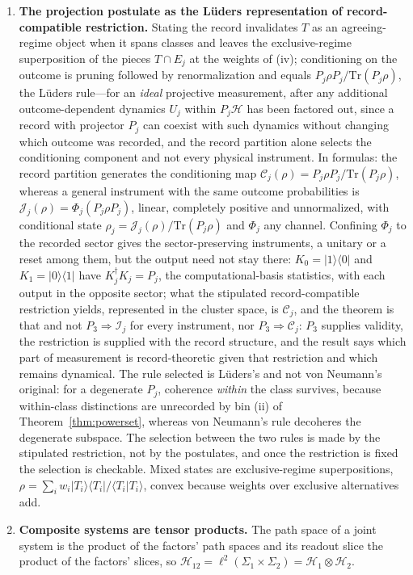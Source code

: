 \begin{theorem}
\begin{enumerate}
\item[(v)] \textbf{The projection postulate as the L\"{u}ders representation of record-compatible restriction.} Stating the record invalidates $T$ as an agreeing-regime object when it spans classes and leaves the exclusive-regime superposition of the pieces $T \cap E_j$ at the weights of (iv); conditioning on the outcome is pruning followed by renormalization and equals $P_j\rho P_j/\mathrm{Tr}(P_j\rho)$, the L\"uders rule---for an \emph{ideal} projective measurement, after any additional outcome-dependent dynamics $U_j$ within $P_j\mathcal{H}$ has been factored out, since a record with projector $P_j$ can coexist with such dynamics without changing which outcome was recorded, and the record partition alone selects the conditioning component and not every physical instrument. In formulas: the record partition generates the conditioning map $\mathcal{C}_j(\rho) = P_j \rho P_j / \mathrm{Tr}(P_j \rho)$, whereas a general instrument with the same outcome probabilities is $\mathcal{J}_j(\rho) = \Phi_j(P_j \rho P_j)$, linear, completely positive and unnormalized, with conditional state $\rho_j = \mathcal{J}_j(\rho)/\mathrm{Tr}(P_j \rho)$ and $\Phi_j$ any channel. Confining $\Phi_j$ to the recorded sector gives the sector-preserving instruments, a unitary or a reset among them, but the output need not stay there: $K_0 = |1\rangle\langle 0|$ and $K_1 = |0\rangle\langle 1|$ have $K_j^{\dagger} K_j = P_j$, the computational-basis statistics, with each output in the opposite sector; what the stipulated record-compatible restriction yields, represented in the cluster space, is $\mathcal{C}_j$, and the theorem is that and not $P_3 \Rightarrow \mathcal{I}_j$ for every instrument, nor $P_3 \Rightarrow \mathcal{C}_j$: $P_3$ supplies validity, the restriction is supplied with the record structure, and the result says which part of measurement is record-theoretic given that restriction and which remains dynamical. The rule selected is L\"uders's and not von Neumann's original: for a degenerate $P_j$, coherence \emph{within} the class survives, because within-class distinctions are unrecorded by bin (ii) of Theorem~\ref{thm:powerset}, whereas von Neumann's rule decoheres the degenerate subspace. The selection between the two rules is made by the stipulated restriction, not by the postulates, and once the restriction is fixed the selection is checkable. Mixed states are exclusive-regime superpositions, $\rho = \sum_i w_i |T_i\rangle\langle T_i|/\langle T_i|T_i\rangle$, convex because weights over exclusive alternatives add.
\item[(vi)] \textbf{Composite systems are tensor products.} The path space of a joint system is the product of the factors' path spaces and its readout slice the product of the factors' slices, so $\mathcal{H}_{12} = \ell^2(\Sigma_1 \times \Sigma_2) = \mathcal{H}_1 \otimes \mathcal{H}_2$.

\end{enumerate}
\end{theorem}
